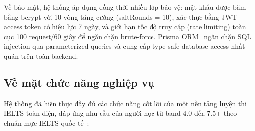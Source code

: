 Về bảo mật, hệ thống áp dụng đồng thời nhiều lớp bảo vệ: mật khẩu được băm bằng bcrypt với 10 vòng tăng cường (saltRounds = 10), xác thực bằng JWT access token có hiệu lực 7 ngày, và giới hạn tốc độ truy cập (rate limiting) toàn cục 100 request/60 giây để ngăn chặn brute-force. Prisma ORM~\cite{prisma-docs} ngăn chặn SQL injection qua parameterized queries và cung cấp type-safe database access nhất quán trên toàn backend.

\subsection{Về mặt chức năng nghiệp vụ}

Hệ thống đã hiện thực đầy đủ các chức năng cốt lõi của một nền tảng luyện thi IELTS toàn diện, đáp ứng nhu cầu của người học từ band 4.0 đến 7.5+ theo chuẩn mực IELTS quốc tế~\cite{ielts-global-stats}:

